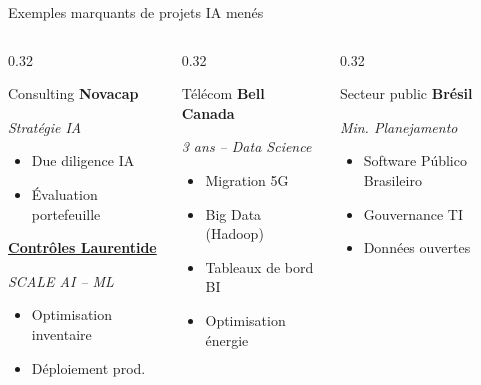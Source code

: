 \documentclass[aspectratio=169,11pt]{beamer}
\begin{document}
\begin{frame}{Exemples marquants de projets IA menés}
  \small
  \begin{columns}[T]
    \begin{column}{0.32\textwidth}
      \begin{block}{Consulting}
        \textbf{Novacap}
        
        {\footnotesize\textit{Stratégie IA}}
        \begin{itemize}\small
          \item Due diligence IA
          \item Évaluation portefeuille
        \end{itemize}
        \vspace{0.2em}
        \textbf{\href{http://laurentide-dashboard-alb-2099058886.ca-central-1.elb.amazonaws.com/}{Contrôles Laurentide}}
        
        {\footnotesize\textit{SCALE AI -- ML}}
        \begin{itemize}\small
          \item Optimisation inventaire
          \item Déploiement prod.
        \end{itemize}
      \end{block}
    \end{column}
    \begin{column}{0.32\textwidth}
      \begin{block}{Télécom}
        \textbf{Bell Canada}
        
        {\footnotesize\textit{3 ans -- Data Science}}
        \begin{itemize}\small
          \item Migration 5G
          \item Big Data (Hadoop)
          \item Tableaux de bord BI
          \item Optimisation énergie
        \end{itemize}
      \end{block}
    \end{column}
    \begin{column}{0.32\textwidth}
      \begin{block}{Secteur public}
        \textbf{Brésil}
        
        {\footnotesize\textit{Min. Planejamento}}
        \begin{itemize}\small
          \item Software Público Brasileiro
          \item Gouvernance TI
          \item Données ouvertes
        \end{itemize}
      \end{block}
    \end{column}
  \end{columns}
  

\end{frame}
\end{document}
